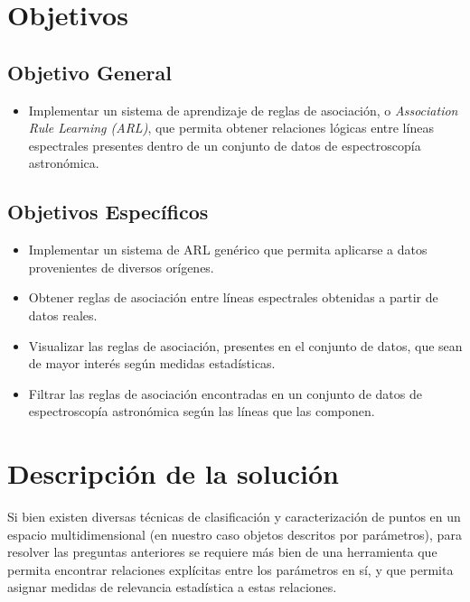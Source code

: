 \begin{intro}
\section*{Objetivos}

\subsection*{Objetivo General}

\begin{itemize}
	\item Implementar un sistema de aprendizaje de reglas de asociación, o \textit{Association Rule Learning (ARL)}, que permita obtener relaciones lógicas entre líneas espectrales presentes dentro de un conjunto de datos de espectroscopía astronómica.
\end{itemize}

\subsection*{Objetivos Específicos}

\begin{itemize}
  \item Implementar un sistema de ARL genérico que permita aplicarse a datos provenientes de diversos orígenes.
  \item Obtener reglas de asociación entre líneas espectrales obtenidas a partir de datos reales.
  \item Visualizar las reglas de asociación, presentes en el conjunto de datos, que sean de mayor interés según medidas estadísticas. 
  \item Filtrar las reglas de asociación encontradas en un conjunto de datos de espectroscopía astronómica según las líneas que las componen.
\end{itemize}

\section*{Descripción de la solución}

Si bien existen diversas técnicas de clasificación y caracterización de puntos en un espacio multidimensional (en nuestro caso objetos descritos por parámetros), para resolver las preguntas anteriores se requiere más bien de una herramienta que permita encontrar relaciones explícitas entre los parámetros en sí, y que permita asignar medidas de relevancia estadística a estas relaciones.


\end{intro}
